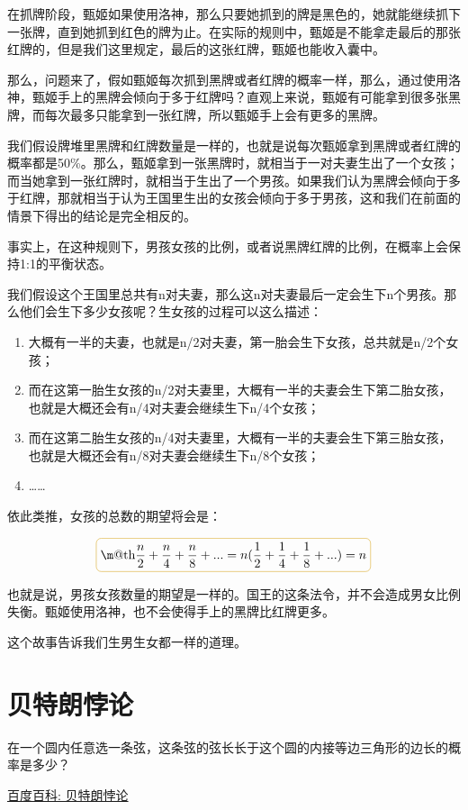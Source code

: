 \documentclass[12pt, letterpaper]{ctexrep}
\makeatletter
\newcommand*{\boxcolor}{Peru}
\renewcommand{\boxed}[1]{\textcolor{\boxcolor}{%
\tikz[baseline={([yshift=-1ex]current bounding box.center)}] \node [rectangle, minimum width=1ex,rounded corners,draw] {\normalcolor\m@th$\displaystyle#1$};}}
\makeatother
\begin{document}
在抓牌阶段，甄姬如果使用洛神，那么只要她抓到的牌是黑色的，她就能继续抓下一张牌，直到她抓到红色的牌为止。在实际的规则中，甄姬是不能拿走最后的那张红牌的，但是我们这里规定，最后的这张红牌，甄姬也能收入囊中。

那么，问题来了，假如甄姬每次抓到黑牌或者红牌的概率一样，那么，通过使用洛神，甄姬手上的黑牌会倾向于多于红牌吗？直观上来说，甄姬有可能拿到很多张黑牌，而每次最多只能拿到一张红牌，所以甄姬手上会有更多的黑牌。

我们假设牌堆里黑牌和红牌数量是一样的，也就是说每次甄姬拿到黑牌或者红牌的概率都是50\%。那么，甄姬拿到一张黑牌时，就相当于一对夫妻生出了一个女孩；而当她拿到一张红牌时，就相当于生出了一个男孩。如果我们认为黑牌会倾向于多于红牌，那就相当于认为王国里生出的女孩会倾向于多于男孩，这和我们在前面的情景下得出的结论是完全相反的。

事实上，在这种规则下，男孩女孩的比例，或者说黑牌红牌的比例，在概率上会保持1:1的平衡状态。

我们假设这个王国里总共有n对夫妻，那么这n对夫妻最后一定会生下n个男孩。那么他们会生下多少女孩呢？生女孩的过程可以这么描述：

\begin{enumerate}
\item{ 大概有一半的夫妻，也就是n/2对夫妻，第一胎会生下女孩，总共就是n/2个女孩； }
\item{ 而在这第一胎生女孩的n/2对夫妻里，大概有一半的夫妻会生下第二胎女孩，也就是大概还会有n/4对夫妻会继续生下n/4个女孩； }
\item{ 而在这第二胎生女孩的n/4对夫妻里，大概有一半的夫妻会生下第三胎女孩，也就是大概还会有n/8对夫妻会继续生下n/8个女孩； }
\item{ …… }
\end{enumerate}


依此类推，女孩的总数的期望将会是：

$$\boxed{
\frac{n}{2} + \frac{n}{4} + \frac{n}{8} + ... = n (\frac{1}{2} + \frac{1}{4} + \frac{1}{8} + ...) = n
}$$

也就是说，男孩女孩数量的期望是一样的。国王的这条法令，并不会造成男女比例失衡。甄姬使用洛神，也不会使得手上的黑牌比红牌更多。

这个故事告诉我们生男生女都一样的道理。


\section{贝特朗悖论}
在一个圆内任意选一条弦，这条弦的弦长长于这个圆的内接等边三角形的边长的概率是多少？

\href{https://baike.baidu.com/item/\%E8\%B4\%9D\%E7\%89\%B9\%E6\%9C\%97\%E6\%82\%96\%E8\%AE\%BA}{百度百科: 贝特朗悖论}
\end{document}
